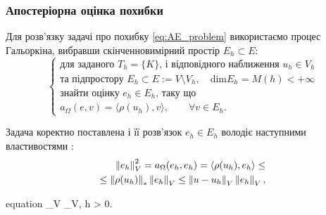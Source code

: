 
\begin{frame}[allowframebreaks]
	\frametitle<presentation>{Апостеріорна оцінка похибки}
	Для розв'язку задачі про похибку
		\eqref{eq:AE_problem} використаємо процес Гальоркіна, вибравши скінченновимірний простір $E_h \subset E$:
		\begin{equation}\label{eq:AEE_formulation}
			\begin{cases}
				\mbox{для заданого } T_h=\{K\} \text{, і відповідного наближення } u_h \in V_h \\
				\text{та підпростору } E_h \subset E:=V \setminus V_h, \quad \text{dim} E_h = M(h) < +\infty \\
				\text{знайти оцінку } e_h \in E_h \text{, таку що} \\
				a_\Omega(e,v) = \langle\rho(u_h), v\rangle, \qquad \forall v \in E_h.
			\end{cases}
		\end{equation}

		\framebreak

			Задача коректно поставлена і її розв'язок $e_h \in E_h$ володіє наступними властивостями :
			\begin{equation}
				\begin{split}
					\left\lVert e_h\right\rVert_V^2 = a_\Omega(e_h, e_h) = \langle\rho(u_h), e_h\rangle \le \\
					\le \left\lVert\rho(u_h)\right\rVert_* \left\lVert e_h\right\rVert_V \le \left\lVert u-u_h\right\rVert_V \left\lVert e_h\right\rVert_V,
				\end{split}
			\end{equation}

			\begin{empheq}[innerbox=\fbox]{equation}
				_V \le {}_V, \quad \forall h > 0.
			\end{empheq}

\end{frame}
